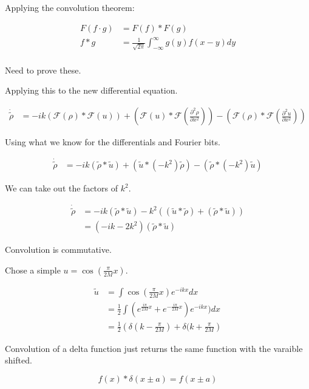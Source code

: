 \documentclass[a4paper]{article}
\begin{document}
Applying the convolution theorem:

\begin{align*}
F(f \cdot g ) & = F(f) * F(g) \\
f*g & = \frac{1}{\sqrt{2 \pi}} \int _{- \infty} ^ {\infty} g(y) f(x-y) dy \\
\end{align*}

Need to prove these. 

Applying this to the new differential equation. 

\begin{align*}
\dot{\tilde{\rho}} & = - ik ( \mathcal{F} (\rho ) * \mathcal{F} ( u) ) + ( \mathcal{F} (u) * \mathcal{F} ( \frac{\partial ^2 \rho}{\partial x ^2} ) ) - ( \mathcal{F} ( \rho ) * \mathcal{F} ( \frac{\partial ^2 u}{\partial x ^2} ) )
\end{align*}

Using what we know for the differentials and Fourier bits. 

\begin{align*}
\dot{\tilde{\rho}} & = -ik \left( \tilde{\rho} * \tilde{u} \right) + \left( \tilde{u} * (-k ^2 ) \tilde{\rho} \right) - \left( \tilde{\rho} * (-k ^2 ) \tilde{u} \right)
\end{align*}

We can take out the factors of $k^2$. 

\begin{align*}
\dot{\tilde{\rho}} & = -ik ( \tilde{\rho} * \tilde{u} ) -k ^2 \left( ( \tilde{u} * \tilde{\rho} ) + ( \tilde{\rho} * \tilde{u} ) \right) \\
& = ( -ik  - 2 k^2 ) ( \tilde{\rho} * \tilde{u} )
\end{align*}

Convolution is commutative. 

Chose a simple $u = \cos(\frac{\pi}{2 M} x ) $. 

\begin{align*}
\tilde{u} & = \int \cos(\frac{\pi}{2 M} x ) e^{-ikx} dx \\
& = \frac{1}{2} \int ( e^{\frac{i \pi}{2 M} x} + e^{ - \frac{i \pi}{2 M} x} ) e^{-ikx} ) dx \\
& = \frac{1}{2} \left( \delta ( k - \frac{\pi}{2 M} ) + \delta ( k + \frac{\pi}{2 M} \right)
\end{align*}

Convolution of a delta function just returns the same function with the varaible shifted. 

\begin{equation}
f(x) * \delta (x \pm a)  = f(x \pm a)  
\end{equation}
\end{document}
